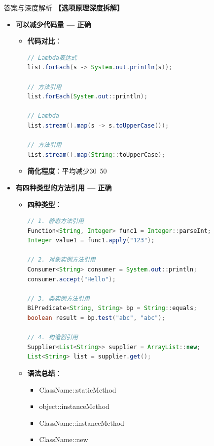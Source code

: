 \documentclass[12pt, a4paper]{ctexart}
\begin{document}
\begin{enumerate}[label=\textbf{\arabic*.}]
\begin{bluebox}{答案与深度解析}
		      \textbf{【选项原理深度拆解】}

		      \begin{itemize}[leftmargin=*, nosep, label={}]
			      \item[A] \textbf{可以减少代码量 — 正确}
			            \begin{itemize}[label={}, leftmargin=*, nosep]
				            \item \textbf{代码对比}：
				                  \begin{lstlisting}[language=Java]
// Lambda表达式
list.forEach(s -> System.out.println(s));

// 方法引用
list.forEach(System.out::println);

// Lambda
list.stream().map(s -> s.toUpperCase());

// 方法引用
list.stream().map(String::toUpperCase);
				      \end{lstlisting}
				            \item \textbf{简化程度}：平均减少30~50%
			            \end{itemize}

			      \item[B] \textbf{有四种类型的方法引用 — 正确}
			            \begin{itemize}[label={}, leftmargin=*, nosep]
				            \item \textbf{四种类型}：
				                  \begin{lstlisting}[language=Java]
// 1. 静态方法引用
Function<String, Integer> func1 = Integer::parseInt;
Integer value1 = func1.apply("123");

// 2. 对象实例方法引用
Consumer<String> consumer = System.out::println;
consumer.accept("Hello");

// 3. 类实例方法引用
BiPredicate<String, String> bp = String::equals;
boolean result = bp.test("abc", "abc");

// 4. 构造器引用
Supplier<List<String>> supplier = ArrayList::new;
List<String> list = supplier.get();
				      \end{lstlisting}
				            \item \textbf{语法总结}：
				                  \begin{itemize}[label={}, nosep]
					                  \item ClassName::staticMethod
					                  \item object::instanceMethod
					                  \item ClassName::instanceMethod
					                  \item ClassName::new
				                  \end{itemize}
			            \end{itemize}


\end{itemize}
\end{bluebox}
\end{enumerate}
\end{document}
